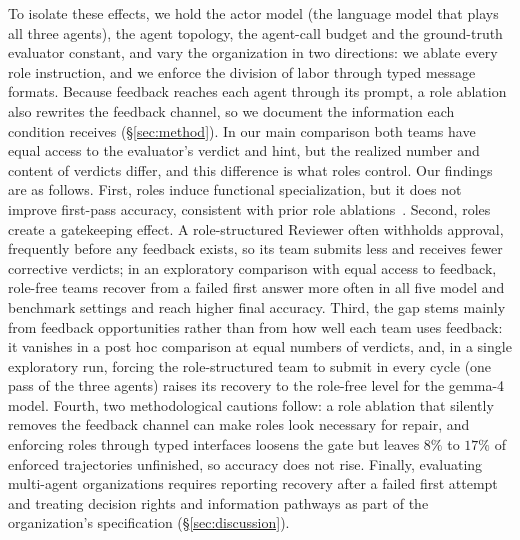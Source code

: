 To isolate these effects, we hold the actor model (the language model that
plays all three agents), the agent topology, the agent-call budget and the
ground-truth evaluator constant, and vary the organization in two
directions: we ablate every role instruction, and we enforce the division
of labor through typed message formats. Because feedback reaches each agent
through its prompt, a role ablation also rewrites the feedback channel, so
we document the information each condition receives (\S\ref{sec:method}).
In our main comparison both teams have equal access to the evaluator's
verdict and hint, but the realized number and content of verdicts differ,
and this difference is what roles control. Our findings are as follows.
First, roles induce functional specialization, but it does not improve
first-pass accuracy, consistent with prior role
ablations~\cite{dylan2026equal,orogat2026architectural}. Second, roles
create a gatekeeping effect. A role-structured Reviewer often withholds
approval, frequently before any feedback exists, so its team submits less
and receives fewer corrective verdicts; in an exploratory comparison with
equal access to feedback, role-free teams recover from a failed first answer
more often in all five model and benchmark settings and reach higher final
accuracy. Third, the gap stems mainly from feedback opportunities rather
than from how well each team uses feedback: it vanishes in a post hoc
comparison at equal numbers of verdicts, and, in a single exploratory run, forcing the
role-structured team to submit in every cycle (one pass of the three
agents) raises its recovery to the role-free level for the gemma-4 model. Fourth, two methodological
cautions follow: a role ablation that silently removes the feedback channel
can make roles look necessary for repair, and enforcing roles through typed
interfaces loosens the gate but leaves $8\%$ to $17\%$ of enforced trajectories unfinished, so accuracy does not rise. Finally, evaluating multi-agent
organizations requires reporting recovery after a failed first attempt and
treating decision rights and information pathways as part of the
organization's specification (\S\ref{sec:discussion}).
